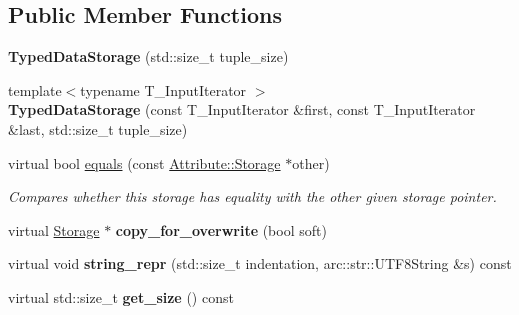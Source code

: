 \subsection*{Public Member Functions}
\begin{DoxyCompactItemize}
\item 
{\bfseries Typed\+Data\+Storage} (std\+::size\+\_\+t tuple\+\_\+size)\hypertarget{classomi_1_1_data_attribute_1_1_typed_data_storage_abfdd2104dc860407dc7b96ca1f9eb53c}{}\label{classomi_1_1_data_attribute_1_1_typed_data_storage_abfdd2104dc860407dc7b96ca1f9eb53c}

\item 
{\footnotesize template$<$typename T\+\_\+\+Input\+Iterator $>$ }\\{\bfseries Typed\+Data\+Storage} (const T\+\_\+\+Input\+Iterator \&first, const T\+\_\+\+Input\+Iterator \&last, std\+::size\+\_\+t tuple\+\_\+size)\hypertarget{classomi_1_1_data_attribute_1_1_typed_data_storage_a4e0a318c1b2c222b3eccff7d4fb03f09}{}\label{classomi_1_1_data_attribute_1_1_typed_data_storage_a4e0a318c1b2c222b3eccff7d4fb03f09}

\item 
virtual bool \hyperlink{classomi_1_1_data_attribute_1_1_typed_data_storage_a3116f40a9b198551f5e9107dabbda390}{equals} (const \hyperlink{classomi_1_1_attribute_1_1_storage}{Attribute\+::\+Storage} $\ast$other)\hypertarget{classomi_1_1_data_attribute_1_1_typed_data_storage_a3116f40a9b198551f5e9107dabbda390}{}\label{classomi_1_1_data_attribute_1_1_typed_data_storage_a3116f40a9b198551f5e9107dabbda390}

\begin{DoxyCompactList}\small\item\em Compares whether this storage has equality with the other given storage pointer. \end{DoxyCompactList}\item 
virtual \hyperlink{classomi_1_1_attribute_1_1_storage}{Storage} $\ast$ {\bfseries copy\+\_\+for\+\_\+overwrite} (bool soft)\hypertarget{classomi_1_1_data_attribute_1_1_typed_data_storage_a0873e417cf1fe8b250f9b67bc9a92a48}{}\label{classomi_1_1_data_attribute_1_1_typed_data_storage_a0873e417cf1fe8b250f9b67bc9a92a48}

\item 
virtual void {\bfseries string\+\_\+repr} (std\+::size\+\_\+t indentation, arc\+::str\+::\+U\+T\+F8\+String \&s) const \hypertarget{classomi_1_1_data_attribute_1_1_typed_data_storage_a7385ba2edb7164da01ca16ed4da8ef6c}{}\label{classomi_1_1_data_attribute_1_1_typed_data_storage_a7385ba2edb7164da01ca16ed4da8ef6c}

\item 
virtual std\+::size\+\_\+t {\bfseries get\+\_\+size} () const \hypertarget{classomi_1_1_data_attribute_1_1_typed_data_storage_a4252b2a48a017d16dec5b5cbe2396729}{}\label{classomi_1_1_data_attribute_1_1_typed_data_storage_a4252b2a48a017d16dec5b5cbe2396729}

\end{DoxyCompactItemize}
